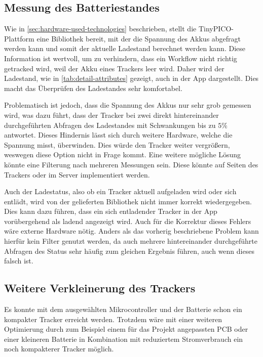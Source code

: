\subsection{Messung des Batteriestandes}

Wie in \autoref{sec:hardware-used-technologies} beschrieben, stellt die TinyPICO-Plattform eine
Bibliothek bereit, mit der die Spannung des \gls{Akku}s abgefragt werden kann und somit der aktuelle
Ladestand berechnet werden kann. Diese Information ist wertvoll, um zu verhindern, dass ein Workflow
nicht richtig getracked wird, weil der \gls{Akku} eines Trackers leer wird. Daher wird der
Ladestand, wie in \autoref{tab:detail-attributes} gezeigt, auch in der App dargestellt. Dies macht das
Überprüfen des Ladestandes sehr komfortabel.

Problematisch ist jedoch, dass die Spannung des \gls{Akku}s nur sehr grob gemessen wird, was dazu
führt, dass der Tracker bei zwei direkt hintereinander durchgeführten Abfragen des Ladestandes mit
Schwankungen bis zu $5\%$ antwortet. Dieses Hindernis lässt sich durch weitere Hardware, welche
die Spannung misst, überwinden. Dies würde den Tracker weiter vergrößern, weswegen diese Option
nicht in Frage kommt. Eine weitere mögliche Lösung könnte eine Filterung nach mehreren Messungen
sein. Diese könnte auf Seiten des Trackers oder im Server implementiert werden.

Auch der Ladestatus, also ob ein Tracker aktuell aufgeladen wird oder sich entlädt, wird von der
gelieferten Bibliothek nicht immer korrekt wiedergegeben. Dies kann dazu führen, dass ein sich
entladender Tracker in der App vorübergehend als ladend angezeigt wird. Auch für die Korrektur dieses
Fehlers wäre externe Hardware nötig. Anders als das vorherig beschriebene Problem kann hierfür kein
Filter genutzt werden, da auch mehrere hintereinander durchgeführte Abfragen des Status sehr häufig zum
gleichen Ergebnis führen, auch wenn dieses falsch ist.

\subsection{Weitere Verkleinerung des Trackers}

Es konnte mit dem ausgewählten Mikrocontroller und der Batterie schon ein kompakter Tracker erreicht werden.
Trotzdem wäre mit einer weiteren Optimierung durch zum Beispiel einem für das Projekt angepassten \gls{PCB}
oder einer kleineren Batterie in Kombination mit reduziertem Stromverbrauch ein noch kompakterer Tracker möglich.

